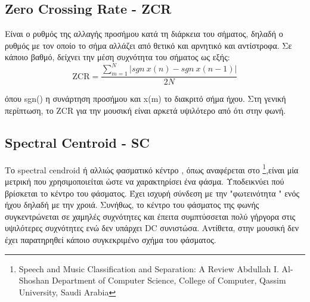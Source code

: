 \subsection{Zero Crossing Rate - ZCR}

Είναι ο ρυθμός της αλλαγής προσήμου κατά τη διάρκεια του σήματος, δηλαδή ο ρυθμός με τον οποίο το σήμα αλλάζει από θετικό και αρνητικό και αντίστροφα. Σε κάποιο βαθμό, δείχνει την μέση συχνότητα του σήματος ως εξής:
\begin{equation}
\text{ZCR} = \frac{\sum_{m=1}^{N} |sgn ~x(n) - sgn~x(n-1)| }{2N}
\end{equation}

όπου sgn() η συνάρτηση προσήμου και x(m) το διακριτό σήμα ήχου. Στη γενική περίπτωση, το ZCR για την μουσική είναι αρκετά υψιλότερο από ότι στην φωνή.


\subsection{Spectral Centroid - SC}

Το spectral cendroid ή αλλιώς φασματικό κέντρο , όπως αναφέρεται στο \footnote{
Speech and Music Classification and Separation: A Review 
Abdullah I. Al-Shoshan
Department of Computer Science, College of Computer, 
Qassim University, Saudi Arabia },είναι μία μετρική που χρησιμοποιείται ώστε να χαρακτηρίσει ένα φάσμα. Υποδεικνύει πού βρίσκεται το κέντρο του φάσματος. Έχει ισχυρή σύνδεση με την "φωτεινότητα " ενός ήχου δηλαδή με την χροιά. Συνήθως, το κέντρο του φάσματος της φωνής συγκεντρώνεται σε χαμηλές συχνότητες και έπειτα συμπτύσσεται πολύ γήργορα στις υψιλότερες συχνότητες ενώ δεν υπάρχει DC συνιστώσα. Αντίθετα, στην μουσική δεν έχει παρατηρηθεί κάποιο συγκεκριμένο σχήμα του φάσματος. 
